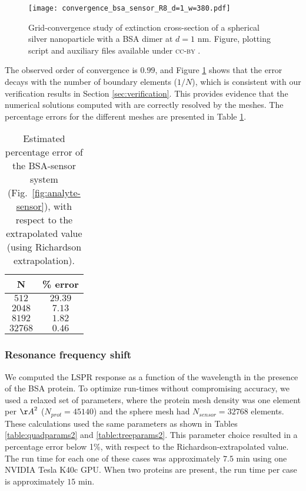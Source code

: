 \begin{figure}[h] %
   \centering
   \texttt{[image: convergence\_bsa\_sensor\_R8\_d=1\_w=380.pdf]} 
   \caption{Grid-convergence study of extinction cross-section of a spherical silver
            nanoparticle with a BSA dimer at $d=1$ nm. Figure, plotting script and auxiliary files available under \textsc{cc-by} \cite{ClementiETal2018c}.}
   \label{fig:error_sphere-bsa}
\end{figure}

The observed order of convergence is $0.99$, and 
Figure \ref{fig:error_sphere-bsa} shows that the error decays with the number
of boundary elements ($1/N$), which is consistent with our verification 
results in Section \ref{sec:verification}. This provides evidence that the
numerical solutions computed with \pygbe are correctly resolved by the meshes.
The percentage errors for the different meshes are presented in Table \ref{table:err_bsa_sensor}.

\begin{table}%
    \centering
    \caption{\label{table:err_bsa_sensor} Estimated percentage error of the BSA-sensor system (Fig.~\ref{fig:analyte-sensor}), with respect to the extrapolated value (using Richardson extrapolation).} 
    \begin{tabular}{c c}
    \hline%
    N & \% error \\
    \hline%
     $512$ & $29.39$ \\
     $2048$ & $7.13$ \\
     $8192$ & $1.82$ \\
     $32768$ & $0.46$ \\
    \hline%
    \end{tabular}
\end{table}

\subsubsection{Resonance frequency shift} \label{sec:bsa_shift}

We computed the LSPR response as a function of the wavelength in the presence 
of the BSA protein. To optimize run-times without compromising accuracy, we used a relaxed
set of parameters, where the protein mesh density was one element per
${\AA}^2$ ($N_{prot}=45140$) and the sphere mesh had $N_{sensor}=32768$ elements. 
These calculations used the same parameters as shown in Tables \ref{table:quadparams2} and \ref{table:treeparams2}.
This parameter choice resulted in a percentage error below 1\%, with respect to the Richardson-extrapolated value.
The run time for each one of these cases was approximately $7.5$ min using one NVIDIA Tesla K40c GPU. 
When two proteins are present, the run time per case is approximately  $15$ min. 

